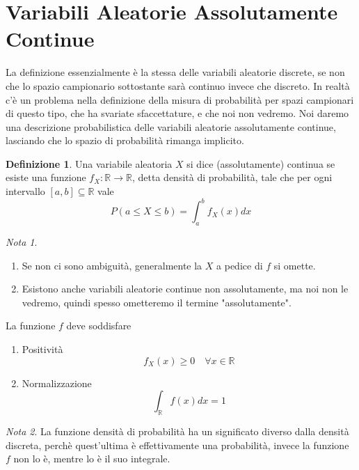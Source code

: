 \documentclass{article}
\theoremstyle{plain}
\theoremstyle{definition}
\newtheorem{definizione}{Definizione}[section]
\theoremstyle{remark}
\newtheorem*{nota}{Nota}
\begin{document}
\section{Variabili Aleatorie Assolutamente Continue} %
\label{sec:variabili_aleatorie_assolutamente_continue}
La definizione essenzialmente è la stessa delle variabili aleatorie discrete, se non che lo spazio campionario sottostante sarà continuo invece che discreto. In realtà c'è un problema nella definizione della misura di probabilità per spazi campionari di questo tipo, che ha svariate sfaccettature, e che noi non vedremo. Noi daremo una descrizione probabilistica delle variabili aleatorie assolutamente continue, lasciando che lo spazio di probabilità rimanga implicito.
\begin{definizione}
	Una variabile aleatoria $X$ si dice (assolutamente) continua se esiste una funzione $f_X:\mathds{R}\to\mathds{R}$, detta densità di probabilità, tale che per ogni intervallo $[a,b]\subseteq\mathds{R}$ vale
	\begin{equation*}
		P(a\leq X\leq b)=\int_a^bf_X(x)dx
	\end{equation*}
\end{definizione}
\begin{nota}
	\begin{enumerate}
		\item Se non ci sono ambiguità, generalmente la $X$ a pedice di $f$ si omette.
		\item Esistono anche variabili aleatorie continue non assolutamente, ma noi non le vedremo, quindi spesso ometteremo il termine "assolutamente".
	\end{enumerate}
\end{nota}
La funzione $f$ deve soddisfare
\begin{enumerate}
	\item Positività
	\begin{equation*}
		f_X(x)\geq0\quad\forall x\in\mathds{R}
	\end{equation*}
	\item Normalizzazione
	\begin{equation*}
		\int_\mathds{R}f(x)dx=1
	\end{equation*}
\end{enumerate}
\begin{nota}
	La funzione densità di probabilità ha un significato diverso dalla densità discreta, perchè quest'ultima è effettivamente una probabilità, invece la funzione $f$ non lo è, mentre lo è il suo integrale.
\end{nota}
\end{document}
